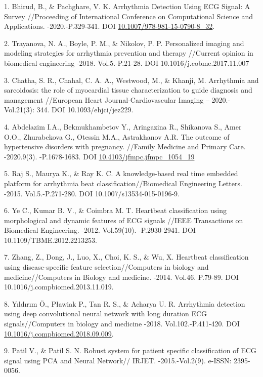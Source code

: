 \begin{refs}
1. Bhirud, B., \& Pachghare, V. K. Arrhythmia Detection Using ECG Signal:
A Survey //Proceeding of International Conference on Computational
Science and Applications. -2020.-P.329-341. DOI
\href{https://doi.org/10.1007/978-981-15-0790-8_32}{10.1007/978-981-15-0790-8\_32}.

2. Trayanova, N. A., Boyle, P. M., \& Nikolov, P. P. Personalized imaging
and modeling strategies for arrhythmia prevention and therapy //Current
opinion in biomedical engineering -2018. Vol.5.-P.21-28. DOI
10.1016/j.cobme.2017.11.007

3. Chatha, S. R., Chahal, C. A. A., Westwood, M., \& Khanji, M.
Arrhythmia and sarcoidosis: the role of myocardial tissue
characterization to guide diagnosis and management //European Heart
Journal-Cardiovascular Imaging -- 2020.-Vol.21(3): 344. DOI
10.1093/ehjci/jez229.

4. Abdelazim I.A., Bekmukhambetov Y., Aringazina R., Shikanova S., Amer
O.O., Zhurabekova G., Otessin M.A., Astrakhanov A.R. The outcome of
hypertensive disorders with pregnancy. //Family Medicine and Primary
Care. -2020.9(3). -P.1678-1683. DOI
\href{https://doi.org/10.4103/jfmpc.jfmpc_1054_19}{10.4103/jfmpc.jfmpc\_1054\_19}

5. Raj S., Maurya K., \& Ray K. C. A knowledge-based real time embedded
platform for arrhythmia beat classification//Biomedical Engineering
Letters. -2015. Vol.5.-P.271-280. DOI 10.1007/s13534-015-0196-9.

6. Ye C., Kumar B. V., \& Coimbra M. T. Heartbeat classification using
morphological and dynamic features of ECG signals //IEEE Transactions on
Biomedical Engineering. -2012. Vol.59(10). -P.2930-2941. DOI
10.1109/TBME.2012.2213253.

7. Zhang, Z., Dong, J., Luo, X., Choi, K. S., \& Wu, X. Heartbeat
classification using disease-specific feature selection//Computers in
biology and medicine//Computers in Biology and medicine. -2014. Vol.46.
P.79-89. DOI 10.1016/j.compbiomed.2013.11.019.

8. Yıldırım Ö., Pławiak P., Tan R. S., \& Acharya U. R. Arrhythmia
detection using deep convolutional neural network with long duration ECG
signals//Computers in biology and medicine -2018. Vol.102.-P.411-420.
DOI
\href{https://doi.org/10.1016/j.compbiomed.2018.09.009}{10.1016/j.compbiomed.2018.09.009}.

9. Patil V., \& Patil S. N. Robust system for patient specific
classification of ECG signal using PCA and Neural Network// IRJET.
-2015.-Vol.2(9). e-ISSN: 2395-0056.


\end{refs}
